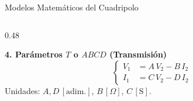 \documentclass[10pt, aspectratio=169]{beamer}
\begin{document}
\begin{frame}{Modelos Matemáticos del Cuadripolo}
\begin{columns}[t]
\begin{column}{0.48\textwidth}
            \vspace{0.5cm}
            \raggedright
            \textbf{4. Parámetros $T$ o $ABCD$ (Transmisión)}
            \begin{equation*}
                \left\{
                \begin{aligned}
                    V_1 & = A\,V_2 - B\,I_2 \\
                    I_1 & = C\,V_2 - D\,I_2
                \end{aligned}
                \right.
            \end{equation*}
            \centering \small Unidades: $A, D\,[\text{adim.}]$, $B\,[\Omega]$, $C\,[\text{S}]$.
        \end{column}
    \end{columns}
\end{frame}
\end{document}
